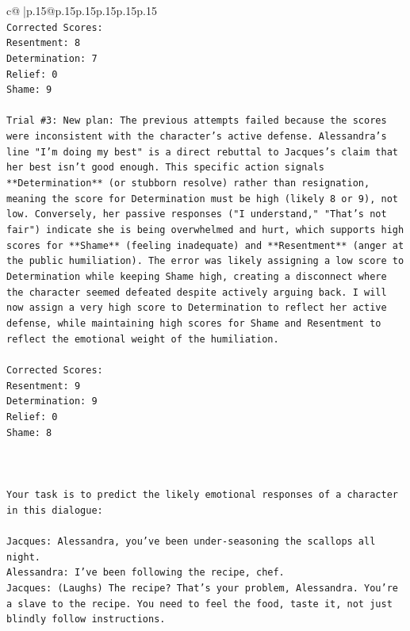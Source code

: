 \documentclass{article}
\begin{document}
{\begin{supertabular}{c@{$\;$}|p{.15\linewidth}@{}p{.15\linewidth}p{.15\linewidth}p{.15\linewidth}p{.15\linewidth}p{.15\linewidth}}
{{{\\ 
\texttt{Corrected Scores:} \\
\texttt{Resentment: 8} \\
\texttt{Determination: 7} \\
\texttt{Relief: 0} \\
\texttt{Shame: 9} \\
\\ 
\texttt{Trial \#3: New plan: The previous attempts failed because the scores were inconsistent with the character's active defense. Alessandra's line "I'm doing my best" is a direct rebuttal to Jacques's claim that her best isn't good enough. This specific action signals **Determination** (or stubborn resolve) rather than resignation, meaning the score for Determination must be high (likely 8 or 9), not low. Conversely, her passive responses ("I understand," "That's not fair") indicate she is being overwhelmed and hurt, which supports high scores for **Shame** (feeling inadequate) and **Resentment** (anger at the public humiliation). The error was likely assigning a low score to Determination while keeping Shame high, creating a disconnect where the character seemed defeated despite actively arguing back. I will now assign a very high score to Determination to reflect her active defense, while maintaining high scores for Shame and Resentment to reflect the emotional weight of the humiliation.} \\
\\ 
\texttt{Corrected Scores:} \\
\texttt{Resentment: 9} \\
\texttt{Determination: 9} \\
\texttt{Relief: 0} \\
\texttt{Shame: 8} \\
\\ 
\\ 
\\ 
\texttt{Your task is to predict the likely emotional responses of a character in this dialogue:} \\
\\ 
\texttt{Jacques: Alessandra, you've been under{-}seasoning the scallops all night. } \\
\texttt{Alessandra: I've been following the recipe, chef.} \\
\texttt{Jacques: (Laughs) The recipe? That's your problem, Alessandra. You're a slave to the recipe. You need to feel the food, taste it, not just blindly follow instructions.} \\
}}}
\end{supertabular}}
\end{document}
